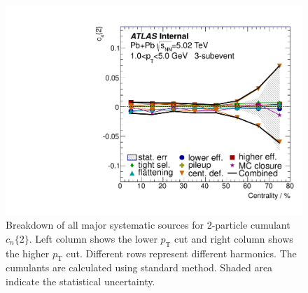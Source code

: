 \begin{figure}[H]
\includegraphics[width=.425\linewidth]{figs/sec_sys/summary/sys_c2_3sub_Har4_Pt1.pdf}
\caption{Breakdown of all major systematic sources for 2-particle cumulant $c_n\{2\}$. Left column shows the lower $p_\text{T}$ cut and right column shows the higher $p_\text{T}$ cut. Different rows represent different harmonics. The cumulants are calculated using standard method. Shaded area indicate the statistical uncertainty.}
\label{fig:sys_sum_c2}
\end{figure}


